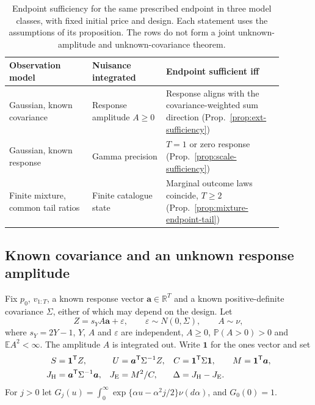 \documentclass[runningheads]{llncs}
\newcommand{\R}{\mathbb R}
\newcommand{\E}{\mathbb E}
\newcommand{\Prob}{\mathbb P}
\begin{document}
\begin{table}[t]
\caption{Endpoint sufficiency for the same prescribed endpoint in three model classes, with fixed initial price and design. Each statement uses the assumptions of its proposition. The rows do not form a joint unknown-amplitude and unknown-covariance theorem.}
\label{tab:models}
\centering\small
\begin{tabular}{@{}p{0.27\linewidth}p{0.24\linewidth}p{0.38\linewidth}@{}}
\toprule
Observation model & Nuisance integrated & Endpoint sufficient iff \\
\midrule
Gaussian, known covariance & Response amplitude $A\geq0$ & Response aligns with the covariance-weighted sum direction (Prop.~\ref{prop:ext-sufficiency}) \\[3pt]
Gaussian, known response & Gamma precision & $T=1$ or zero response (Prop.~\ref{prop:scale-sufficiency}) \\[3pt]
Finite mixture, common tail ratios & Finite catalogue state & Marginal outcome laws coincide, $T\geq2$ (Prop.~\ref{prop:mixture-endpoint-tail}) \\
\bottomrule
\end{tabular}
\end{table}

\subsection{Known covariance and an unknown response amplitude}
\label{sec:gauss}
Fix $p_0$, $v_{1:T}$, a known response vector $\boldsymbol a\in\R^T$ and a known positive-definite covariance $\Sigma$, either of which may depend on the design. Let
\begin{equation}
 Z=s_Y A\boldsymbol a+\varepsilon,\qquad \varepsilon\sim N(0,\Sigma),\qquad A\sim\nu,
 \label{eq:ext-model}
\end{equation}
where $s_Y=2Y-1$, $Y$, $A$ and $\varepsilon$ are independent, $A\geq0$, $\Prob(A>0)>0$ and $\E A^2<\infty$. The amplitude $A$ is integrated out. Write $\boldsymbol1$ for the ones vector and set
\begin{align}
 S&=\boldsymbol1^{\mathsf T}Z, & U&=\boldsymbol a^{\mathsf T}\Sigma^{-1}Z, & C&=\boldsymbol1^{\mathsf T}\Sigma\boldsymbol1, & M&=\boldsymbol1^{\mathsf T}\boldsymbol a,\nonumber\\
 J_{\rm H}&=\boldsymbol a^{\mathsf T}\Sigma^{-1}\boldsymbol a, & J_{\rm E}&=M^2/C, & \Delta&=J_{\rm H}-J_{\rm E}. &&
 \label{eq:ext-strengths}
\end{align}
For $j>0$ let $G_j(u)=\int_0^\infty\exp\{\alpha u-\alpha^2j/2\}\nu(d\alpha)$, and $G_0(0)=1$.
\end{document}
